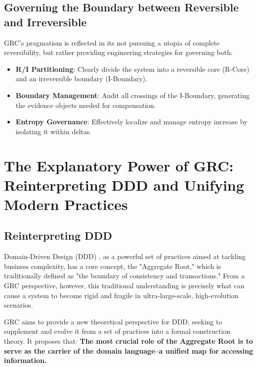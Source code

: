\documentclass[11pt]{article}
\begin{document}
\subsection{Governing the Boundary between Reversible and Irreversible}

GRC's pragmatism is reflected in its not pursuing a utopia of complete reversibility, but rather providing engineering strategies for governing both:
\begin{itemize}
    \item \textbf{R/I Partitioning}: Clearly divide the system into a reversible core (R-Core) and an irreversible boundary (I-Boundary).
    \item \textbf{Boundary Management}: Audit all crossings of the I-Boundary, generating the evidence objects needed for compensation.
    \item \textbf{Entropy Governance}: Effectively localize and manage entropy increase by isolating it within deltas.
\end{itemize}

\section{The Explanatory Power of GRC: Reinterpreting DDD and Unifying Modern Practices}

\subsection{Reinterpreting DDD}

Domain-Driven Design (DDD) \cite{evans2004}, as a powerful set of practices aimed at tackling business complexity, has a core concept, the "Aggregate Root," which is traditionally defined as "the boundary of consistency and transactions." From a GRC perspective, however, this traditional understanding is precisely what can cause a system to become rigid and fragile in ultra-large-scale, high-evolution scenarios.

GRC aims to provide a new theoretical perspective for DDD, seeking to supplement and evolve it from a set of practices into a formal construction theory. It proposes that: \textbf{The most crucial role of the Aggregate Root is to serve as the carrier of the domain language--a unified map for accessing information.}
\end{document}
